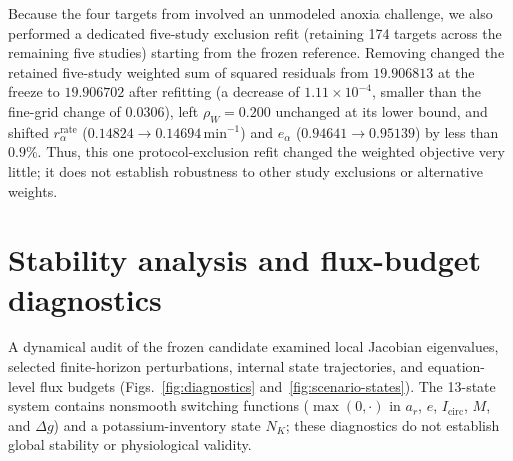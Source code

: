 \documentclass[final,5p,times]{elsarticle}
\begin{document}
Because the four targets from \citet{Wang1990} involved an unmodeled anoxia challenge, we also performed a dedicated five-study exclusion refit (retaining 174 targets across the remaining five studies) starting from the frozen reference. Removing \citet{Wang1990} changed the retained five-study weighted sum of squared residuals from \(19.906813\) at the freeze to \(19.906702\) after refitting (a decrease of \(1.11\times10^{-4}\), smaller than the fine-grid change of \(0.0306\)), left \(\rho_W = 0.200\) unchanged at its lower bound, and shifted \(r_\alpha^{\mathrm{rate}}\) (\(0.14824 \to 0.14694\,\mathrm{min}^{-1}\)) and \(e_\alpha\) (\(0.94641 \to 0.95139\)) by less than \(0.9\%\). Thus, this one protocol-exclusion refit changed the weighted objective very little; it does not establish robustness to other study exclusions or alternative weights.

\section{Stability analysis and flux-budget diagnostics}\label{sec:stability}

A dynamical audit of the frozen candidate examined local Jacobian eigenvalues, selected finite-horizon perturbations, internal state trajectories, and equation-level flux budgets (Figs.~\ref{fig:diagnostics} and~\ref{fig:scenario-states}). The 13-state system contains nonsmooth switching functions (\(\max(0,\cdot)\) in \(a_r\), \(e\), \(I_{\mathrm{circ}}\), \(M\), and \(\Delta g\)) and a potassium-inventory state \(N_K\); these diagnostics do not establish global stability or physiological validity.
\end{document}
